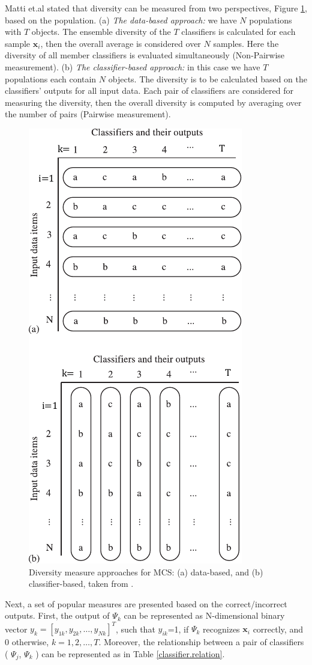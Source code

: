 Matti et.al \cite{aksela2006} stated that diversity can be measured from two perspectives, Figure \ref{ch2:diversity-measures}, based on the population. (a) \textit{The data-based approach:} we have $N$ populations with $T$ objects. The ensemble diversity of the $T$ classifiers is calculated for each sample $\textbf{x}_i$, then the overall average is considered over $N$ samples. Here the diversity of all member classifiers is evaluated simultaneously (Non-Pairwise measurement). (b) \textit{The classifier-based approach:} in this case we have $T$ populations each contain $N$ objects. The diversity is to be calculated based on the classifiers' outputs for all input data. Each pair of classifiers are considered for measuring the diversity, then the overall diversity is computed by averaging over the number of pairs (Pairwise measurement).       

\begin{figure}[!ht]
    \centering
    \includegraphics[width=.5\textwidth]{2_Background/figures/fig-diveristy-measure.pdf}
    \caption{Diversity measure approaches for MCS: (a) data-based, and (b) classifier-based, taken from \cite{aksela2006}.}
    \label{ch2:diversity-measures}
\end{figure}




Next, a set of popular measures are presented based on the correct/incorrect outputs. First, the output of $\Psi_k$ can be represented as N-dimensional binary vector $y_k= \left[y_{1k}, y_{2k}, \ldots, y_{Nk}\right]^T$, such that $y_{ik}$=1, if $\Psi_k$ recognizes $\textbf{x}_i$ correctly, and 0 otherwise, $k=1,2,\dots,T$. Moreover, the relationship between a pair of classifiers ( $\Psi_j$, $\Psi_{k}$ ) can be represented as in Table \ref{classifier.relation}. 

